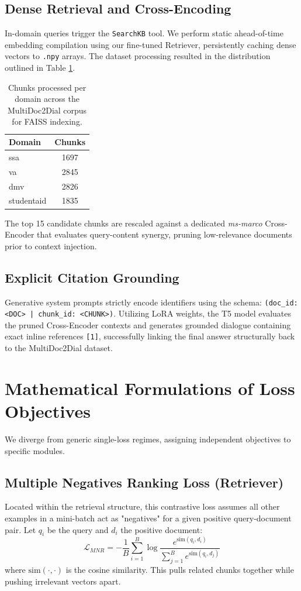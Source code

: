 \documentclass[11pt]{article}
\begin{document}
\subsection{Dense Retrieval and Cross-Encoding}
In-domain queries trigger the \texttt{SearchKB} tool. We perform static ahead-of-time embedding compilation using our fine-tuned Retriever, persistently caching dense vectors to \texttt{.npy} arrays. The dataset processing resulted in the distribution outlined in Table \ref{tab:chunks}.

\begin{table}[h]
\centering
\begin{tabular}{lc}
\toprule
\textbf{Domain} & \textbf{Chunks} \\
\midrule
ssa & 1697 \\
va & 2845 \\
dmv & 2826 \\
studentaid & 1835 \\
\bottomrule
\end{tabular}
\caption{Chunks processed per domain across the MultiDoc2Dial corpus for FAISS indexing.}
\label{tab:chunks}
\end{table}

The top 15 candidate chunks are rescaled against a dedicated \textit{ms-marco} Cross-Encoder that evaluates query-content synergy, pruning low-relevance documents prior to context injection.

\subsection{Explicit Citation Grounding}
Generative system prompts strictly encode identifiers using the schema: \texttt{(doc\_id: <DOC> | chunk\_id: <CHUNK>)}. Utilizing LoRA weights, the T5 model evaluates the pruned Cross-Encoder contexts and generates grounded dialogue containing exact inline references \texttt{[1]}, successfully linking the final answer structurally back to the MultiDoc2Dial dataset.

\section{Mathematical Formulations of Loss Objectives}
We diverge from generic single-loss regimes, assigning independent objectives to specific modules.

\subsection{Multiple Negatives Ranking Loss (Retriever)}
Located within the retrieval structure, this contrastive loss assumes all other examples in a mini-batch act as "negatives" for a given positive query-document pair. Let $q_i$ be the query and $d_i$ the positive document:
\begin{equation}
\mathcal{L}_{MNR} = - \frac{1}{B} \sum_{i=1}^{B} \log \frac{e^{\text{sim}(q_i, d_i)}}{\sum_{j=1}^{B} e^{\text{sim}(q_i, d_j)}}
\end{equation}
where $\text{sim}(\cdot, \cdot)$ is the cosine similarity. This pulls related chunks together while pushing irrelevant vectors apart.
\end{document}
